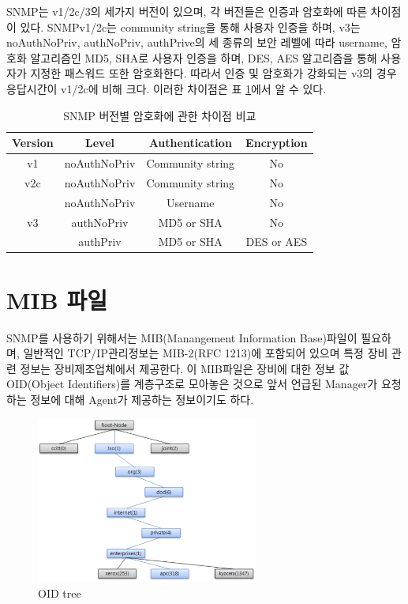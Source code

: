 \documentclass[11pt
  , a4paper
  , article
  , oneside
]{memoir}
\begin{document}
\hfil\break
\hfil\break
\hfil\break
\hfil\break

SNMP는 v1/2c/3의 세가지 버전이 있으며, 각 버전들은 인증과 암호화에 따른 차이점이 있다. SNMPv1/2c는 community string을 통해 사용자 인증을 하며, v3는 noAuthNoPriv, authNoPriv, authPrive의 세 종류의 보안 레벨에 따라 username, 암호화 알고리즘인 MD5, SHA로 사용자 인증을 하며, DES, AES 알고리즘을 통해 사용자가 지정한 패스워드 또한 암호화한다. 따라서 인증 및 암호화가 강화되는 v3의 경우 응답시간이 v1/2c에 비해 크다. 이러한 차이점은 표 \ref{table:conparision}\citep{comparison}에서 알 수 있다.

\begin{table}[h!]
\begin{center}
\begin{tabular}{c|c|c|c}\hline
Version & Level & Authentication & Encryption \\ \hline
v1 & noAuthNoPriv & Community string & No \\ \hline
v2c & noAuthNoPriv & Community string & No \\ \hline
 & noAuthNoPriv & Username & No \\ \cline{2-4}
v3 & authNoPriv & MD5 or SHA & No \\ \cline{2-4}
 & authPriv & MD5 or SHA & DES or AES \\ \hline
\end{tabular}
\caption{SNMP 버전별 암호화에 관한 차이점 비교}
  \label{table:conparision}  
\end{center}
\end{table} 

\section{MIB 파일}
SNMP를 사용하기 위해서는 MIB(Manangement Information Base)파일이 필요하며, 일반적인 TCP/IP관리정보는 MIB-2(RFC 1213)에 포함되어 있으며 특정 장비 관련 정보는 장비제조업체에서 제공한다. 이 MIB파일은 장비에 대한 정보 값 OID(Object Identifiers)를 계층구조로 모아놓은 것으로 앞서 언급된 Manager가 요청하는 정보에 대해 Agent가 제공하는 정보이기도 하다. 

\begin{figure}[h!]
  \centering
  \includegraphics[width=0.65\textwidth]{./images/oid_tree.eps}
  \caption{OID tree}
  \label{fig:oid_tree} 
\end{figure}
\end{document}
